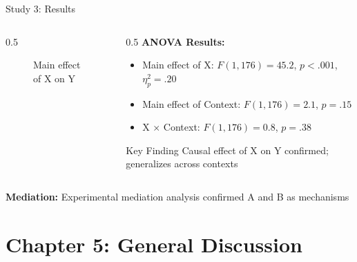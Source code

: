 \documentclass[aspectratio=169,12pt]{beamer}
\begin{document}
\begin{frame}{Study 3: Results}
  \begin{columns}[T]
    
    \begin{column}{0.5\textwidth}
      \begin{figure}
        \centering
        \caption{Main effect of X on Y}
      \end{figure}
    \end{column}
    
    \begin{column}{0.5\textwidth}
      \textbf{ANOVA Results:}
      \begin{itemize}
        \item Main effect of X: $F(1,176) = 45.2$, $p < .001$, $\eta^2_p = .20$
        \item Main effect of Context: $F(1,176) = 2.1$, $p = .15$
        \item X × Context: $F(1,176) = 0.8$, $p = .38$
      \end{itemize}
      
      \vspace{0.5cm}
      
      \begin{block}{Key Finding}
        Causal effect of X on Y confirmed; generalizes across contexts
      \end{block}
    \end{column}
    
  \end{columns}
  
  \vspace{0.5cm}
  
  \textbf{Mediation:} Experimental mediation analysis confirmed A and B as mechanisms
\end{frame}


\section{Chapter 5: General Discussion}
\end{document}
